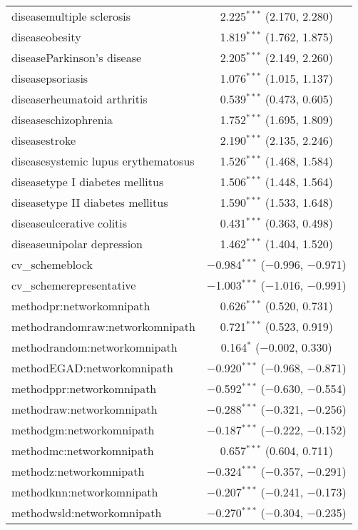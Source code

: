 \begin{table}[!htbp]
\begin{tabular}{@{\extracolsep{5pt}}lc}
  diseasemultiple sclerosis & 2.225$^{***}$ (2.170, 2.280) \\ 
  diseaseobesity & 1.819$^{***}$ (1.762, 1.875) \\ 
  diseaseParkinson's disease & 2.205$^{***}$ (2.149, 2.260) \\ 
  diseasepsoriasis & 1.076$^{***}$ (1.015, 1.137) \\ 
  diseaserheumatoid arthritis & 0.539$^{***}$ (0.473, 0.605) \\ 
  diseaseschizophrenia & 1.752$^{***}$ (1.695, 1.809) \\ 
  diseasestroke & 2.190$^{***}$ (2.135, 2.246) \\ 
  diseasesystemic lupus erythematosus & 1.526$^{***}$ (1.468, 1.584) \\ 
  diseasetype I diabetes mellitus & 1.506$^{***}$ (1.448, 1.564) \\ 
  diseasetype II diabetes mellitus & 1.590$^{***}$ (1.533, 1.648) \\ 
  diseaseulcerative colitis & 0.431$^{***}$ (0.363, 0.498) \\ 
  diseaseunipolar depression & 1.462$^{***}$ (1.404, 1.520) \\ 
  cv\_schemeblock & $-$0.984$^{***}$ ($-$0.996, $-$0.971) \\ 
  cv\_schemerepresentative & $-$1.003$^{***}$ ($-$1.016, $-$0.991) \\ 
  methodpr:networkomnipath & 0.626$^{***}$ (0.520, 0.731) \\ 
  methodrandomraw:networkomnipath & 0.721$^{***}$ (0.523, 0.919) \\ 
  methodrandom:networkomnipath & 0.164$^{*}$ ($-$0.002, 0.330) \\ 
  methodEGAD:networkomnipath & $-$0.920$^{***}$ ($-$0.968, $-$0.871) \\ 
  methodppr:networkomnipath & $-$0.592$^{***}$ ($-$0.630, $-$0.554) \\ 
  methodraw:networkomnipath & $-$0.288$^{***}$ ($-$0.321, $-$0.256) \\ 
  methodgm:networkomnipath & $-$0.187$^{***}$ ($-$0.222, $-$0.152) \\ 
  methodmc:networkomnipath & 0.657$^{***}$ (0.604, 0.711) \\ 
  methodz:networkomnipath & $-$0.324$^{***}$ ($-$0.357, $-$0.291) \\ 
  methodknn:networkomnipath & $-$0.207$^{***}$ ($-$0.241, $-$0.173) \\ 
  methodwsld:networkomnipath & $-$0.270$^{***}$ ($-$0.304, $-$0.235) \\ 

\end{tabular}
\end{table}
